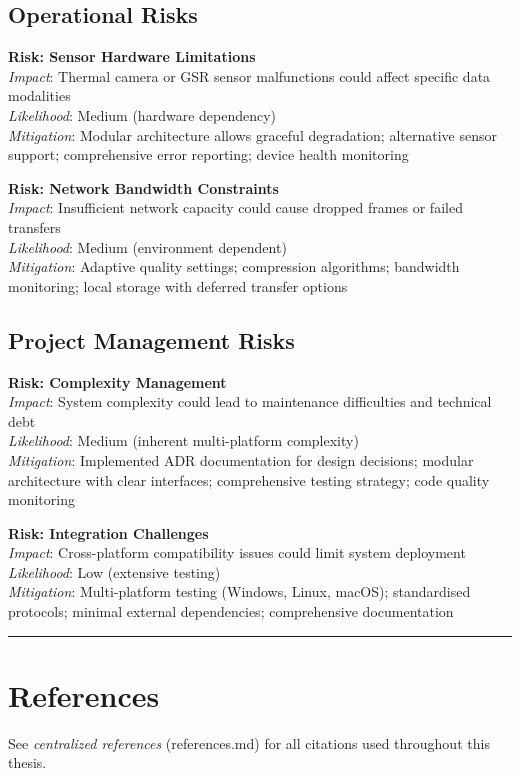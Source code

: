 \subsection{Operational Risks}
\textbf{Risk: Sensor Hardware Limitations}\\
\emph{Impact}: Thermal camera or GSR sensor malfunctions could affect specific data modalities\\
\emph{Likelihood}: Medium (hardware dependency)\\
\emph{Mitigation}: Modular architecture allows graceful degradation; alternative sensor support; comprehensive error reporting; device health monitoring

\textbf{Risk: Network Bandwidth Constraints}\\
\emph{Impact}: Insufficient network capacity could cause dropped frames or failed transfers\\
\emph{Likelihood}: Medium (environment dependent)\\
\emph{Mitigation}: Adaptive quality settings; compression algorithms; bandwidth monitoring; local storage with deferred transfer options

\subsection{Project Management Risks}
\textbf{Risk: Complexity Management}\\
\emph{Impact}: System complexity could lead to maintenance difficulties and technical debt\\
\emph{Likelihood}: Medium (inherent multi-platform complexity)\\
\emph{Mitigation}: Implemented ADR documentation for design decisions; modular architecture with clear interfaces; comprehensive testing strategy; code quality monitoring

\textbf{Risk: Integration Challenges}\\
\emph{Impact}: Cross-platform compatibility issues could limit system deployment\\
\emph{Likelihood}: Low (extensive testing)\\
\emph{Mitigation}: Multi-platform testing (Windows, Linux, macOS); standardised protocols; minimal external dependencies; comprehensive documentation

\bigskip
\noindent\rule{\linewidth}{0.4pt}

\section*{References}
See \emph{centralized references} (references.md) for all citations used throughout this thesis.
